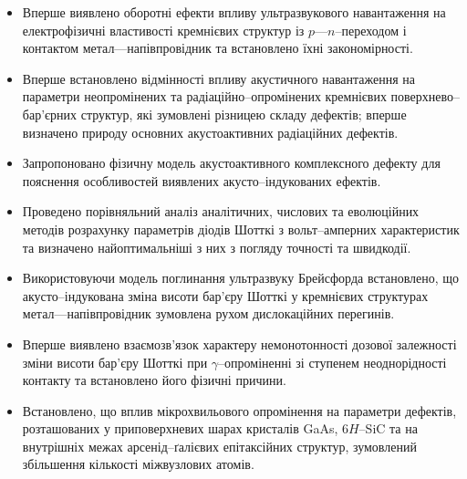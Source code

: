 \begin{itemize}[leftmargin=0em,itemindent=1.5em]
\renewcommand{\labelitemi}{$\bullet$}
  \item Вперше виявлено оборотні ефекти впливу ультразвукового навантаження на електрофізичні
   властивості кремнієвих структур із $p$---$n$--переходом і контактом метал---напівпровідник
   та встановлено їхні закономірності.

  \item Вперше встановлено відмінності впливу акустичного навантаження на параметри неопромінених та радіаційно--опромінених кремнієвих поверхнево--бар'єрних структур,
  які зумовлені різницею складу дефектів;
      вперше визначено природу основних акустоактивних радіаційних дефектів.

  \item Запропоновано фізичну модель акустоактивного комплексного дефекту для пояснення особливостей виявлених акусто--індукованих ефектів.

  \item Проведено порівняльний аналіз аналітичних, числових та еволюційних методів розрахунку параметрів діодів Шотткі з вольт--амперних характеристик та визначено найоптимальніші з них з погляду точності та швидкодії.

  \item Використовуючи модель поглинання ультразвуку Брейсфорда встановлено, що акусто--індукована зміна висоти бар'єру Шотткі у кремнієвих структурах метал---напівпровідник  зумовлена рухом дислокаційних перегинів.


  \item Вперше виявлено  взаємозв'язок характеру немонотонності дозової залежності зміни висоти бар'єру Шотткі при $\gamma$--опроміненні зі ступенем неоднорідності контакту та встановлено його фізичні причини.

  \item Встановлено, що  вплив мікрохвильового опромінення на параметри дефектів, розташованих у приповерхневих шарах кристалів GaAs, 6$H$--SiC та на внутрішніх межах арсенід--ґалієвих епітаксійних структур, зумовлений збільшення кількості міжвузлових атомів.

\end{itemize}



